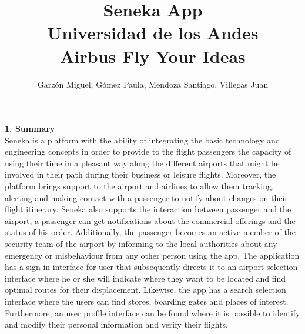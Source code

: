 \documentclass[]{article}
\begin{document}
\title{Seneka App\\
Universidad de los Andes\\
Airbus Fly Your Ideas}
\author{Garzón Miguel, Gómez Paula, Mendoza Santiago, Villegas Juan}
\maketitle


\Large{
\textbf{1. Summary}\\
}
Seneka is a platform with the ability of integrating the basic technology and engineering concepts in order to provide to the flight passengers the capacity of using their time in a pleasant way along the different airports that might be involved in their path during their business or leisure flights. Moreover, the platform brings support to the airport and airlines to allow them tracking, alerting and making contact with a passenger to notify about changes on their flight itinerary. Seneka also supports the interaction between passenger and the airport, a passenger can get notifications about the commercial offerings and the status of his order. Additionally, the passenger becomes an active member of the security team of the airport by informing to the local authorities about any emergency or misbehaviour from any other person using the app. The application has a sign-in interface for user that subsequently directs it to an airport selection interface where he or she will indicate where they want to be located and find optimal routes for their displacement. Likewise, the app has a search selection interface where the users can find stores, boarding gates and places of interest. Furthermore, an user profile interface can be found where it is possible to identify and modify their personal information and verify their flights.\\
\end{document}
